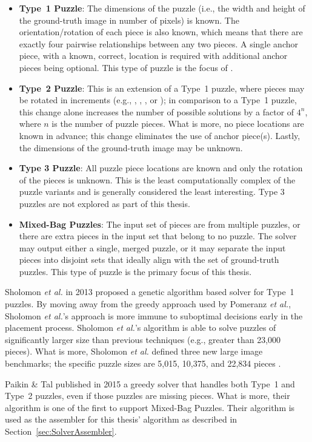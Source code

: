 \begin{itemize}

	\item \textbf{Type~1 Puzzle}: The dimensions of the puzzle (i.e., the width and height of the ground-truth image in number of pixels) is known.  The orientation/rotation of each piece is also known, which means that there are exactly four pairwise relationships between any two pieces.  A single anchor piece, with a known, correct, location is required with additional anchor pieces being optional.  This type of puzzle is the focus of \cite{cho2010, pomeranz2011}.
	
	\item \textbf{Type~2 Puzzle}: This is an extension of a Type~1 puzzle, where pieces may be rotated in  increments (e.g., , , , or ); in comparison to a Type~1 puzzle, this change alone increases the number of possible solutions by a factor of $4^n$, where $n$ is the number of puzzle pieces.  What is more, no piece locations are known in advance; this change eliminates the use of anchor piece(s).  Lastly, the dimensions of the ground-truth image may be unknown.
	
	\item \textbf{Type 3 Puzzle}: All puzzle piece locations are known and only the rotation of the pieces is unknown.  This is the least computationally complex of the puzzle variants and is generally considered the least interesting.  Type 3 puzzles are not explored as part of this thesis.
	
	\item \textbf{Mixed-Bag Puzzles}: The input set of pieces are from multiple puzzles, or there are extra pieces in the input set that belong to no puzzle.  The solver may output either a single, merged puzzle, or it may separate the input pieces into disjoint sets that ideally align with the set of ground-truth puzzles.  This type of puzzle is the primary focus of this thesis.

\end{itemize}

Sholomon \textit{et al.} \cite{sholomon2013} in 2013 proposed a genetic algorithm based solver for Type~1 puzzles.  By moving away from the greedy approach used by Pomeranz \textit{et al.}, Sholomon \textit{et al.}'s approach is more immune to suboptimal decisions early in the placement process. Sholomon \textit{et al.}'s algorithm is able to solve puzzles of significantly larger size than previous techniques (e.g., greater than 23,000 pieces).  What is more, Sholomon \textit{et al.} defined three new large image benchmarks; the specific puzzle sizes are 5,015, 10,375, and 22,834 pieces \cite{sholomonBenchmarkImages}.

Paikin \& Tal \cite{paikin2015} published in 2015 a greedy solver that handles both Type~1 and Type~2 puzzles, even if those puzzles are missing pieces.  What is more, their algorithm is one of the first to support Mixed-Bag Puzzles. Their algorithm is used as the assembler for this thesis' algorithm as described in Section~\ref{sec:SolverAssembler}.